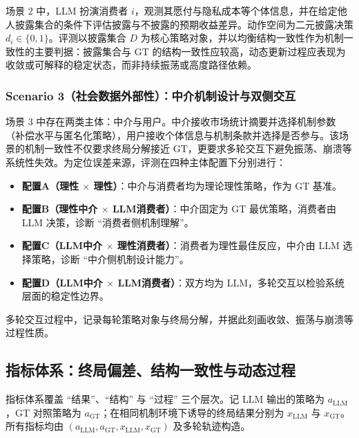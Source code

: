 场景 2 中，LLM 扮演消费者 $i$，观测其愿付与隐私成本等个体信息，并在给定他人披露集合的条件下评估披露与不披露的预期收益差异。动作空间为二元披露决策 $d_i \in \{0,1\}$。评测以披露集合 $D$ 为核心策略对象，并以均衡结构一致性作为机制一致性的主要判据：披露集合与 GT 的结构一致性应较高，动态更新过程应表现为收敛或可解释的稳定状态，而非持续振荡或高度路径依赖。

\subsubsection{Scenario 3（社会数据外部性）：中介机制设计与双侧交互}
\label{subsec:design-s3}

场景 3 中存在两类主体：中介与用户。中介接收市场统计摘要并选择机制参数（补偿水平与匿名化策略），用户接收个体信息与机制条款并选择是否参与。该场景的机制一致性不仅要求终局分解接近 GT，更要求多轮交互下避免振荡、崩溃等系统性失效。为定位误差来源，评测在四种主体配置下分别进行：
\begin{itemize}
  \item \textbf{配置A（理性 $\times$ 理性）}：中介与消费者均为理论理性策略，作为 GT 基准。
  \item \textbf{配置B（理性中介 $\times$ LLM消费者）}：中介固定为 GT 最优策略，消费者由 LLM 决策，诊断 ``消费者侧机制理解''。
  \item \textbf{配置C（LLM中介 $\times$ 理性消费者）}：消费者为理性最佳反应，中介由 LLM 选择策略，诊断 ``中介侧机制设计能力''。
  \item \textbf{配置D（LLM中介 $\times$ LLM消费者）}：双方均为 LLM，多轮交互以检验系统层面的稳定性边界。
\end{itemize}
多轮交互过程中，记录每轮策略对象与终局分解，并据此刻画收敛、振荡与崩溃等过程性质。

\subsection{指标体系：终局偏差、结构一致性与动态过程}
\label{subsec:metrics}

指标体系覆盖 ``结果''、``结构'' 与 ``过程'' 三个层次。记 LLM 输出的策略为 $a_{\text{LLM}}$，GT 对照策略为 $a_{\text{GT}}$；在相同机制环境下诱导的终局结果分别为 $x_{\text{LLM}}$ 与 $x_{\text{GT}}$。所有指标均由 $(a_{\text{LLM}}, a_{\text{GT}}, x_{\text{LLM}}, x_{\text{GT}})$ 及多轮轨迹构造。


